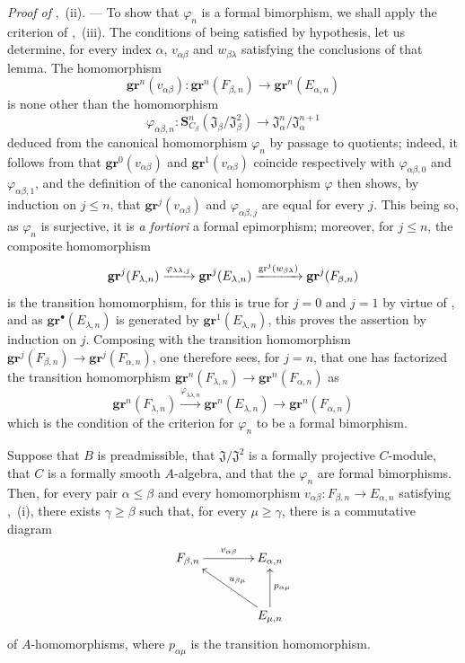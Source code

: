 \begin{env}[19.5.6.6]
\label{0.19.5.6.6}
\emph{Proof of} ,~(ii). ---
To show that $\varphi_n$ is a formal bimorphism, we shall apply the criterion of ,~(iii).
The conditions of  being satisfied by hypothesis, let us determine, for every index $\alpha$, $v_{\alpha\beta}$ and $w_{\beta\lambda}$ satisfying the conclusions of that lemma.
The homomorphism
\[
  \mathbf{gr}^n(v_{\alpha\beta}):\mathbf{gr}^n(F_{\beta,n})\to\mathbf{gr}^n(E_{\alpha,n})
\]
is none other than the homomorphism
\[
  \varphi_{\alpha\beta,n}:\mathbf{S}_{C_\beta}^n(\mathfrak{J}_\beta/\mathfrak{J}_\beta^2)\to\mathfrak{J}_\alpha^n/\mathfrak{J}_\alpha^{n+1}
\]
deduced from the canonical homomorphism $\varphi_n$  by passage to quotients;
indeed, it follows from  that $\mathbf{gr}^0(v_{\alpha\beta})$ and $\mathbf{gr}^1(v_{\alpha\beta})$ coincide respectively with $\varphi_{\alpha\beta,0}$ and $\varphi_{\alpha\beta,1}$, and the definition of the canonical homomorphism $\varphi$ then shows, by induction on $j\leq n$, that $\mathbf{gr}^j(v_{\alpha\beta})$ and $\varphi_{\alpha\beta,j}$ are equal for every $j$.
This being so, as $\varphi_n$ is surjective, it is \emph{a fortiori} a formal epimorphism;
moreover, for $j\leq n$, the composite homomorphism
\[
  \mathbf{gr}^j(F_{\lambda,n})\xrightarrow{\varphi_{\lambda\lambda,j}}\mathbf{gr}^j(E_{\lambda,n})\xrightarrow{\operatorname{gr}^j(w_{\beta\lambda})}\mathbf{gr}^j(F_{\beta,n})
\]
is the transition homomorphism, for this is true for $j=0$ and $j=1$ by virtue of , and as $\mathbf{gr}^\bullet(E_{\lambda,n})$ is generated by $\mathbf{gr}^1(E_{\lambda,n})$, this proves the assertion by induction on $j$.
Composing with the transition homomorphism $\mathbf{gr}^j(F_{\beta,n})\to\mathbf{gr}^j(F_{\alpha,n})$, one therefore sees, for $j=n$, that one has factorized the transition homomorphism $\mathbf{gr}^n(F_{\lambda,n})\to\mathbf{gr}^n(F_{\alpha,n})$ as
\[
  \mathbf{gr}^n(F_{\lambda,n})\xrightarrow{\varphi_{\lambda\lambda,n}}\mathbf{gr}^n(E_{\lambda,n})\to\mathbf{gr}^n(F_{\alpha,n})
\]
which is the condition of the criterion  for $\varphi_n$ to be a formal bimorphism.
\end{env}

\begin{lemma}[19.5.6.7]
\label{0.19.5.6.7}
Suppose that $B$ is preadmissible, that $\mathfrak{J}/\mathfrak{J}^2$ is a formally projective $C$-module, that $C$ is a formally smooth $A$-algebra, and that the $\varphi_n$ are formal bimorphisms.
Then, for every pair $\alpha\leq\beta$ and every homomorphism $v_{\alpha\beta}:F_{\beta,n}\to E_{\alpha,n}$ satisfying ,~{\rm(i)}, there exists $\gamma\geq\beta$ such that, for every $\mu\geq\gamma$, there is a commutative diagram
\[
\xymatrix@C=4em@R=3em{
  F_{\beta,n} \ar[r]^{v_{\alpha\beta}} & E_{\alpha,n} \\
  & E_{\mu,n} \ar[ul]_{u_{\beta\mu}} \ar[u]_{p_{\alpha\mu}}
}
\]
of $A$-homomorphisms, where $p_{\alpha\mu}$ is the transition homomorphism.
\end{lemma}

